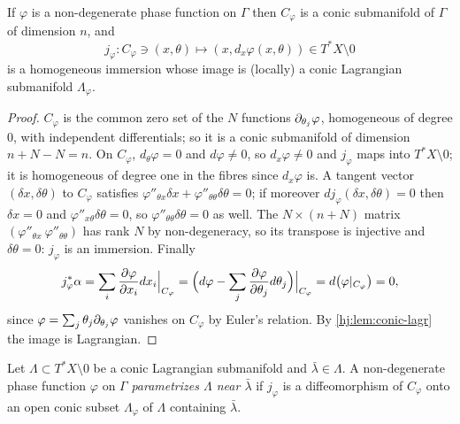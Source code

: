 \begin{proposition}\label{hj:prop:phase-lagrangian}
  If $\varphi$ is a non-degenerate phase function on $\Gamma$ then $C_\varphi$ is
  a conic submanifold of $\Gamma$ of dimension $n$, and
  \begin{equation*}
    j_\varphi:C_\varphi\ni(x,\theta)\longmapsto(x,d_x\varphi(x,\theta))\in
    T^*X\setminus0
  \end{equation*}
  is a homogeneous immersion whose image is (locally) a conic Lagrangian
  submanifold $\Lambda_\varphi$.
\end{proposition}
\begin{proof}
  $C_\varphi$ is the common zero set of the $N$ functions
  $\partial_{\theta_j}\varphi$, homogeneous of degree $0$, with independent
  differentials; so it is a conic submanifold of dimension $n+N-N=n$.  On
  $C_\varphi$, $d_\theta\varphi=0$ and $d\varphi\neq0$, so $d_x\varphi\neq0$ and
  $j_\varphi$ maps into $T^*X\setminus0$; it is homogeneous of degree one in
  the fibres since $d_x\varphi$ is.  A tangent vector $(\delta x,\delta\theta)$ to
  $C_\varphi$ satisfies $\varphi''_{\theta x}\delta x+\varphi''_{\theta\theta}
  \delta\theta=0$; if moreover $dj_\varphi(\delta x,\delta\theta)=0$ then
  $\delta x=0$ and $\varphi''_{x\theta}\delta\theta=0$, so
  $\varphi''_{\theta\theta}\delta\theta=0$ as well.  The $N\times(n+N)$ matrix
  $(\varphi''_{\theta x}\ \varphi''_{\theta\theta})$ has rank $N$ by
  non-degeneracy, so its transpose is injective and $\delta\theta=0$: $j_\varphi$
  is an immersion.  Finally
  \begin{equation*}
    j_\varphi^*\alpha=\sum_i\frac{\partial\varphi}{\partial x_i}dx_i\Big|_{C_\varphi}
    =\Big(d\varphi-\sum_j\frac{\partial\varphi}{\partial\theta_j}d\theta_j\Big)\Big|_{C_\varphi}
    =d\big(\varphi|_{C_\varphi}\big)=0,
  \end{equation*}
  since $\varphi=\sum_j\theta_j\partial_{\theta_j}\varphi$ vanishes on $C_\varphi$ by
  Euler's relation.  By \cref{hj:lem:conic-lagr} the image is Lagrangian.
\end{proof}

\begin{definition}\label{hj:def:parametrize}
  Let $\Lambda\subset T^*X\setminus0$ be a conic Lagrangian submanifold and
  $\bar\lambda\in\Lambda$.  A non-degenerate phase function $\varphi$ on $\Gamma$
  \emph{parametrizes $\Lambda$ near $\bar\lambda$} if $j_\varphi$ is a
  diffeomorphism of $C_\varphi$ onto an open conic subset $\Lambda_\varphi$ of
  $\Lambda$ containing $\bar\lambda$.
\end{definition}

